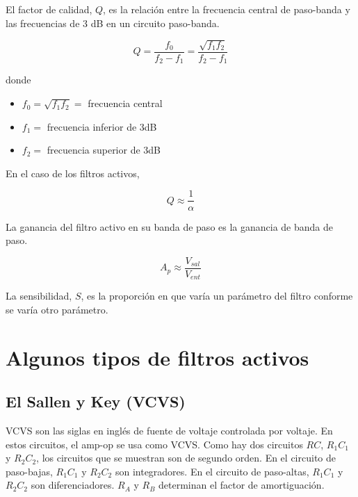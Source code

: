 El factor de calidad, $Q$, es la relación entre la frecuencia central de paso-banda y las frecuencias de 3 dB en un circuito paso-banda.

\begin{equation}
    Q = \frac{f_0}{f_2 - f_1} = \frac{\sqrt{f_1 f_2}}{f_2 - f_1}
\end{equation}

donde 
\begin{itemize}
    \item $f_0 = \sqrt{f_1 f_2} = $ frecuencia central
    \item $f_1 = $ frecuencia inferior de 3dB
    \item $f_2 = $ frecuencia superior de 3dB
\end{itemize}

En el caso de los filtros activos,

\begin{equation}
    Q \approx \frac{1}{\alpha}
\end{equation}

La ganancia del filtro activo en su banda de paso es la ganancia de banda de paso.

\begin{equation}
    A_p \approx \frac{V_{sal}}{V_{ent}}
\end{equation}

La sensibilidad, $S$, es la proporción en que varía un parámetro del filtro conforme se varía otro parámetro.

\section{Algunos tipos de filtros activos}
\subsection{El Sallen y Key (VCVS)}
VCVS son las siglas en inglés de fuente de voltaje controlada por voltaje. En estos circuitos, el amp-op se usa como VCVS. Como hay dos circuitos $RC$, $R_1 C_1$ y $R_2 C_2$, los circuitos que se muestran son de segundo orden. En el circuito de paso-bajas, $R_1C_1$ y $R_2C_2$ son integradores. En el circuito de paso-altas, $R_1C_1$ y $R_2C_2$ son diferenciadores. $R_A$ y $R_B$ determinan el factor de amortiguación.

